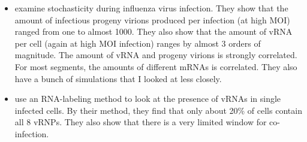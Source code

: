 \documentclass[9pt,lineno]{elife}
\begin{document}
\begin{itemize}
\item \citet{heldt2015single} examine stochasticity during influenza virus infection.
They show that the amount of infectious progeny virions produced per infection (at high MOI) ranged from one to almost 1000.
They also show that the amount of vRNA per cell (again at high MOI infection) ranges by almost 3 orders of magnitude.
The amount of vRNA and progeny virions is strongly correlated.
For most segments, the amounts of different mRNAs is correlated.
They also have a bunch of simulations that I looked at less closely.

\item \citet{dou2017analysis} use an RNA-labeling method to look at the presence of vRNAs in single infected cells.
By their method, they find that only about 20\% of cells contain all 8 vRNPs.
They also show that there is a very limited window for co-infection.

\end{itemize}
\end{document}
